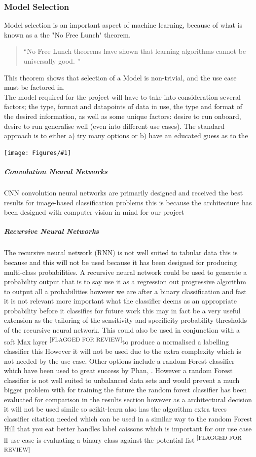 \documentclass{UoNMCHA}
\newcommand{\flagforreview}{\textsuperscript{\color{red} [FLAGGED FOR REVIEW]}}
\newcommand{\inlineQuote}[1]{``#1''}
\newcommand{\fancyquote}[1]{\begin{quotation}\inlineQuote{#1}\end{quotation}}
\newcommand{\fFigure}[3]{
        \begin{center}  
            \texttt{[image: Figures/\#1]}  
        \captionof{figure}{#2}
            \label{#1}
        \end{center}
}
\numberwithin{equation}{section}
\begin{document}
\subsubsection{Model Selection}
Model selection is an important aspect of machine learning, because of what is known as a the "No Free Lunch" theorem. 
\fancyquote{No Free Lunch theorems have shown that learning algorithms cannot be universally good. \cite{NFL_quote}}
This theorem shows that selection of a Model is non-trivial, and the use case must be factored in.\\

The model required for the project will have to take into consideration several factors; the type, format and datapoints of data in use, the type and format of the desired information, as well as some unique factors: desire to run onboard, desire to run generalise well (even into different use cases). The standard approach is to either a) try many options or b) have an educated guess as to the 

\fFigure{modelselection.png}{Scikit-learn's suggested model selection process}{0.8}


\subparagraph{Convolution Neural Networks}
CNN convolution neural networks are primarily designed and received the best results for image-based classification problems this is because the architecture has been designed with computer vision in mind for our project

\subparagraph{Recursive Neural Networks}
The recursive neural network (RNN) is not well suited to tabular data this is because and this will not be used because it has been designed for producing multi-class probabilities. A recursive neural network could be used to generate a probability output that is to say use it as a regression out progressive algorithm to output all a probabilities however we are after a binary classification and fast it is not relevant more important what the classifier deems as an appropriate probability before it classifies for future work this may in fact be a very useful extension as the tailoring of the sensitivity and specificity probability thresholds of the recursive neural network. This could also be used in conjunction with a soft Max layer\flagforreview to produce a normalised a labelling classifier this %
However it will not be used due to the extra complexity which is not needed by the use case. Other options include a random Forest classifier which have been used to great success by Phan, \cite{Phan2015}. However a random Forest classifier is not well suited to unbalanced data sets and would prevent a much bigger problem with for training the future the random forest classifier has been evaluated for comparison in the results section however as a architectural decision it will not be used simile so scikit-learn also has the algorithm extra trees classifier citation needed which can be used in a similar way to the random Forest Hill that you eat better handles label caissons which is important for our use case ll use case is evaluating a binary class against the potential list \flagforreview
\end{document}
